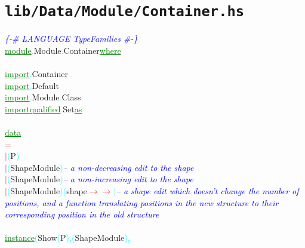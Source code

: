 \section{\texttt{lib/Data/Module/Container.hs}}
\label{mod:Data.Module.Container}
\textcolor{blue}{{\it{}\{-\# LANGUAGE TypeFamilies \#-\}}}\\\textcolor{green}{\underline{module}}\textcolor{cyan}{.}{\rm{}Module}\textcolor{cyan}{.}{\rm{}Container}\hsspace \textcolor{green}{\underline{where}}\\\\\textcolor{green}{\underline{import}}\textcolor{cyan}{.}{\rm{}Container}\\\textcolor{green}{\underline{import}}\textcolor{cyan}{.}{\rm{}Default}\\\textcolor{green}{\underline{import}}\textcolor{cyan}{.}{\rm{}Module}\textcolor{cyan}{.}{\rm{}Class}\\\textcolor{green}{\underline{import}}\hsspace \textcolor{green}{\underline{qualified}}\textcolor{cyan}{.}{\rm{}Set}\hsspace \textcolor{green}{\underline{as}}\\\\\textcolor{green}{\underline{data}}\\\hstab \textcolor{red}{=}\\\hstab \textcolor{red}{\ensuremath{|}}\hsspace \textcolor{cyan}{(}{\rm{}P}\textcolor{cyan}{)}\\\hstab \textcolor{red}{\ensuremath{|}}\hsspace \textcolor{cyan}{(}{\rm{}ShapeModule}\textcolor{cyan}{)}\hsspace \textcolor{blue}{{\it{}-- a non-decreasing edit to the shape}}\\\hstab \textcolor{red}{\ensuremath{|}}\hsspace \textcolor{cyan}{(}{\rm{}ShapeModule}\textcolor{cyan}{)}\hsspace \textcolor{blue}{{\it{}-- a non-increasing edit to the shape}}\\\hstab \textcolor{red}{\ensuremath{|}}\hsspace \textcolor{cyan}{(}{\rm{}ShapeModule}\textcolor{cyan}{)}\hsspace \textcolor{cyan}{(}{\rm{}shape}\hsspace \textcolor{red}{\ensuremath{\rightarrow}}\hsspace \textcolor{red}{\ensuremath{\rightarrow}}\textcolor{cyan}{)}\hsspace \textcolor{blue}{{\it{}-- a shape edit which doesn't change the number of positions, and a function translating positions in the new structure to their corresponding position in the old structure}}\\\\\textcolor{green}{\underline{instance}}\hsspace \textcolor{cyan}{(}{\rm{}Show}\hsspace \textcolor{cyan}{(}{\rm{}P}\textcolor{cyan}{)}\textcolor{cyan}{,}\hsspace \textcolor{cyan}{(}{\rm{}ShapeModule}\textcolor{cyan}{)}\textcolor{cyan}{,}\hsspace 